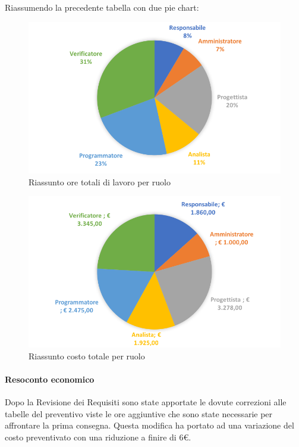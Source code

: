 \documentclass[../PianoDiProgetto_v3.0.0.tex]{subfiles}
\begin{document}
			Riassumendo la precedente tabella con due pie chart:	
			\begin{figure}[!h]
				\centering
				\includegraphics[width=\textwidth]{Preventivo/Immagini/rendicontato_oreRuolo.png}
				\caption{Riassunto ore totali di lavoro per ruolo}
			\end{figure}	
			\newpage
			\begin{figure}[!h]
				\centering
				\includegraphics[width=\textwidth]{Preventivo/Immagini/rendicontato_costoRuolo.png}
				\caption{Riassunto costo totale per ruolo}
			\end{figure}
			
			\paragraph{Resoconto economico} Dopo la Revisione dei Requisiti sono state apportate le dovute correzioni alle tabelle del preventivo viste le ore aggiuntive che sono state necessarie per affrontare la prima consegna. Questa modifica ha portato ad una variazione del costo preventivato con una riduzione a finire di 6\euro.
\end{document}
